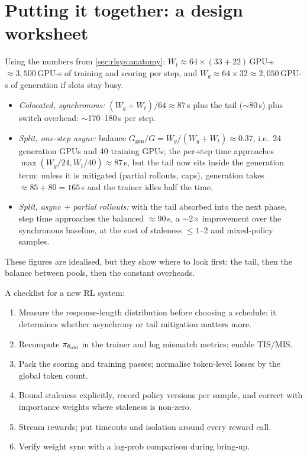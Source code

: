 \section{Putting it together: a design worksheet}\label{sec:rlsys:design}

\begin{napkinmath}
Using the numbers from \cref{sec:rlsys:anatomy}: $W_t \approx 64\times(33+22)$\,GPU-s
$\approx 3{,}500$\,GPU-s of training and scoring per step, and
$W_g \approx 64 \times 32 \approx 2{,}050$\,GPU-s of generation if slots stay busy.
\begin{itemize}
\item \emph{Colocated, synchronous:} $(W_g+W_t)/64 \approx 87$\,s plus the tail ($\sim$80\,s) plus
switch overhead: $\sim$170--180\,s per step.
\item \emph{Split, one-step async:} balance $G_{\text{gen}}/G = W_g/(W_g+W_t)\approx 0.37$,
i.e.\ 24 generation GPUs and 40 training GPUs; the per-step time approaches
$\max(W_g/24, W_t/40)\approx 87$\,s, but the tail now sits inside the generation term: unless it
is mitigated (partial rollouts, caps), generation takes $\approx 85+80 = 165$\,s and the
trainer idles half the time.
\item \emph{Split, async + partial rollouts:} with the tail absorbed into the next phase, step
time approaches the balanced $\approx 90$\,s, a $\sim$2$\times$ improvement over the synchronous
baseline, at the cost of staleness $\le 1$--2 and mixed-policy samples.
\end{itemize}
These figures are idealised, but they show where to look first: the tail, then the balance
between pools, then the constant overheads.
\end{napkinmath}

A checklist for a new RL system:
\begin{enumerate}
\item Measure the response-length distribution before choosing a schedule; it determines
whether asynchrony or tail mitigation matters more.
\item Recompute $\pi_{\theta_{\text{old}}}$ in the trainer and log mismatch metrics; enable TIS/MIS.
\item Pack the scoring and training passes; normalise token-level losses by the global token
count.
\item Bound staleness explicitly, record policy versions per sample, and correct with
importance weights where staleness is non-zero.
\item Stream rewards; put timeouts and isolation around every reward call.
\item Verify weight sync with a log-prob comparison during bring-up.
\end{enumerate}

